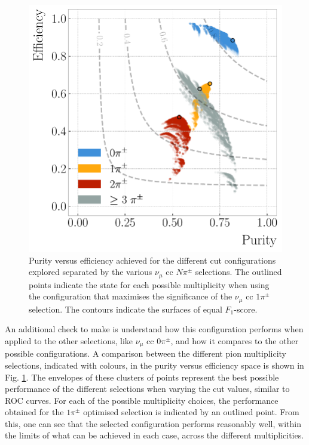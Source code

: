 \begin{figure}[t]
    \centering
    \includegraphics[width=.70\linewidth]{Images/GAr_selection/pion_selection_all_in_one_purity_vs_efficiency.pdf}
    \caption[Purity versus efficiency achieved for the different cut configurations explored separated by the various $\nu_{\mu}$ \gls{cc} $N\pi^{\pm}$ selections.]{Purity versus efficiency achieved for the different cut configurations explored separated by the various $\nu_{\mu}$ \gls{cc} $N\pi^{\pm}$ selections. The outlined points indicate the state for each possible multiplicity when using the configuration that maximises the significance of the $\nu_{\mu}$ \gls{cc} $1\pi^{\pm}$ selection. The contours indicate the surfaces of equal $F_{1}$-score.}
    \label{fig:pion_purity_vs_efficiency}
\end{figure}

An additional check to make is understand how this configuration performs when applied to the other selections, like $\nu_{\mu}$ \gls{cc} $0\pi^{\pm}$, and how it compares to the other possible configurations. A comparison between the different pion multiplicity selections, indicated with colours, in the purity versus efficiency space is shown in Fig. \ref{fig:pion_purity_vs_efficiency}. The envelopes of these clusters of points represent the best possible performance of the different selections when varying the cut values, similar to ROC curves. For each of the possible multiplicity choices, the performance obtained for the $1\pi^{\pm}$ optimised selection is indicated by an outlined point. From this, one can see that the selected configuration performs reasonably well, within the limits of what can be achieved in each case, across the different multiplicities.

